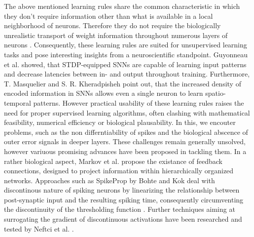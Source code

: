 \documentclass[letterpaper, 10 pt, conference]{ieeeconf}  %
\begin{document}
The above mentioned learning rules share the common characteristic in which they don't require information other than what is available 
in a local neighborhood of neurons. Therefore they do not require the biologically unrealistic 
transport of weight information throughout numerous layers of neurons \cite{samadiDeepLearningDynamic2017} \cite{chintaAdaptiveOptimalControl2012}
\cite{crickRecentExcitementNeural1989}\cite{decoNeurodynamicalCorticalModel2004}. Consequently, these learning rules 
are suited for unsupervised learning tasks and pose interesting 
insights from a neuroscientific standpoint. Guyonneau et al. \cite{masquelierSpikeTimingDependent2008} \cite{tavanaeiDeepLearningSpiking2019}
showed, that STDP-equipped SNNs are capable of learning input 
patterns and decrease latencies between in- and output throughout training. Furthermore, T. Masquelier \cite{masquelierSpikeTimingDependent2008}
and S. R. Kheradpisheh \cite{tavanaeiDeepLearningSpiking2019} point out, that 
the increased density of encoded information in SNNs allows even a single neuron to learn spatio-temporal patterns. However practical usability
of these learning rules raises the need for proper supervised learning algorithms, often clashing with mathematical feasibility, numerical efficiency 
or biological plausability. In this, we encouter problems, such as the non differntiability of spikes and the biological abscence of outer error 
signals in deeper layers. These challenges remain generally unsolved, however variuous promising advances have been proposed in tackling them.
In a rather biological aspect, Markov et al.\cite{markovAnatomyHierarchyFeedforward2014} propose the existance of
feedback connections, designed to project information within
hierarchically organized networks. Approaches such as SpikeProp by Bohte and Kok deal with discontinous nature of spiking neurons by linearizing 
the relationship between post-synaptic input and the resulting spiking time, consequently circumventing the discontinuity of the 
thresholding function \cite{bohteSpikePropBackpropagationNetworks}. Further techniques aiming at surrogating the gradient of 
discontinuous activations have been researched 
and tested by Neftci et al. \cite{neftciSurrogateGradientLearning2019}.
\end{document}
